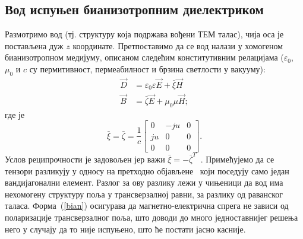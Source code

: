 \documentclass[main.tex]{subfiles}
\begin{document}
\subsection{Вод испуњен бианизотропним диелектриком}
Размотримо вод (тј. структуру која подржава вођени ТЕМ талас), чија оса је постављена дуж $z$ координате. Претпоставимо да се вод налази у хомогеном бианизотропном медијуму, описаном следећим конститутивним релацијама ($\varepsilon_0$, $\mu_0$ и $c$ су пермитивност, пермеабилност и брзина светлости у вакууму):
\begin{equation}\label{const}
\begin{split}
\vec{D} & = \varepsilon_0\varepsilon \vec{E} + \bar{\xi}\vec{H}\\
\vec{B} & = \bar{\zeta} \vec{E} + \mu_0\mu \vec{H};
\end{split}
\end{equation}
где је
\begin{equation}\label{bian}
\bar{\xi} = \bar{\zeta} = \frac{1}{c}
\begin{bmatrix}
0 & -ju & 0 \\
ju & 0 & 0 \\
0 & 0 & 0
\end{bmatrix}.
\end{equation}
Услов реципрочности је задовољен јер важи $\bar{\xi}=-\bar{\zeta}^T$~\cite{shivola}. Примећујемо да се тензори разликују у односу на претходно објављене~\cite{marques, chen:05, kriegler, shalaev} који поседују само један вандијагонални елемент. Разлог за ову разлику лежи у чињеници да вод има нехомогену структуру поља у трансверзалној равни, за разлику од раванског таласа. Форма~(\ref{bian}) осигурава да магнетно-електрична спрега не зависи од поларизације трансверзалног поља, што доводи до много једноставнијег решења него у случају да то није испуњено, што ће постати јасно касније.
\end{document}
